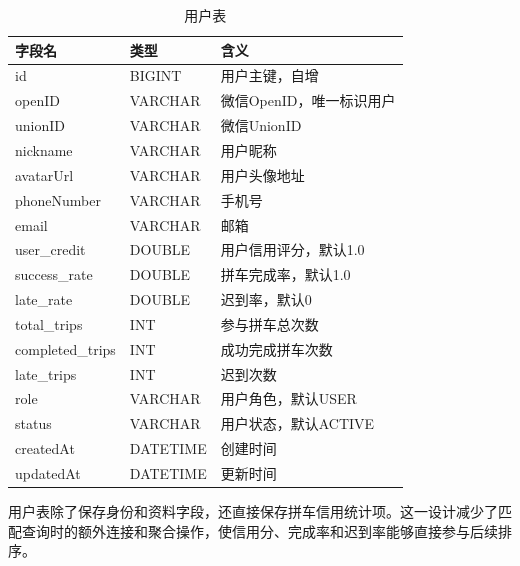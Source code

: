 \begin{table}[!htbp]
  \caption{用户表}
  \label{tab:users-table}
  \centering
  \small
  \begin{tabular}{p{3.0cm}p{2.3cm}p{7.0cm}}
    \toprule
    字段名 & 类型 & 含义 \\
    \midrule
    id & BIGINT & 用户主键，自增 \\
    openID & VARCHAR & 微信OpenID，唯一标识用户 \\
    unionID & VARCHAR & 微信UnionID \\
    nickname & VARCHAR & 用户昵称 \\
    avatarUrl & VARCHAR & 用户头像地址 \\
    phoneNumber & VARCHAR & 手机号 \\
    email & VARCHAR & 邮箱 \\
    user\_credit & DOUBLE & 用户信用评分，默认1.0 \\
    success\_rate & DOUBLE & 拼车完成率，默认1.0 \\
    late\_rate & DOUBLE & 迟到率，默认0 \\
    total\_trips & INT & 参与拼车总次数 \\
    completed\_trips & INT & 成功完成拼车次数 \\
    late\_trips & INT & 迟到次数 \\
    role & VARCHAR & 用户角色，默认USER \\
    status & VARCHAR & 用户状态，默认ACTIVE \\
    createdAt & DATETIME & 创建时间 \\
    updatedAt & DATETIME & 更新时间 \\
    \bottomrule
  \end{tabular}
\end{table}

用户表除了保存身份和资料字段，还直接保存拼车信用统计项。这一设计减少了匹配查询时的额外连接和聚合操作，使信用分、完成率和迟到率能够直接参与后续排序。

